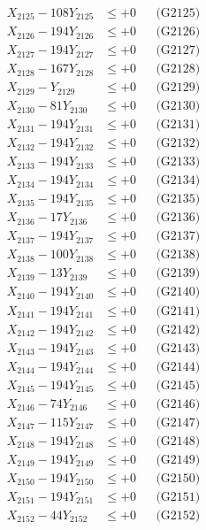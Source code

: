 \documentclass[a4paper,10pt]{article}
\begin{document}
{\begin{align}
X_{2125} - 108Y_{2125} &\leq +0 && \text{(G2125)} \\
X_{2126} - 194Y_{2126} &\leq +0 && \text{(G2126)} \\
X_{2127} - 194Y_{2127} &\leq +0 && \text{(G2127)} \\
X_{2128} - 167Y_{2128} &\leq +0 && \text{(G2128)} \\
X_{2129} - Y_{2129} &\leq +0 && \text{(G2129)} \\
X_{2130} - 81Y_{2130} &\leq +0 && \text{(G2130)} \\
\allowbreak
X_{2131} - 194Y_{2131} &\leq +0 && \text{(G2131)} \\
X_{2132} - 194Y_{2132} &\leq +0 && \text{(G2132)} \\
X_{2133} - 194Y_{2133} &\leq +0 && \text{(G2133)} \\
X_{2134} - 194Y_{2134} &\leq +0 && \text{(G2134)} \\
X_{2135} - 194Y_{2135} &\leq +0 && \text{(G2135)} \\
X_{2136} - 17Y_{2136} &\leq +0 && \text{(G2136)} \\
X_{2137} - 194Y_{2137} &\leq +0 && \text{(G2137)} \\
X_{2138} - 100Y_{2138} &\leq +0 && \text{(G2138)} \\
X_{2139} - 13Y_{2139} &\leq +0 && \text{(G2139)} \\
X_{2140} - 194Y_{2140} &\leq +0 && \text{(G2140)} \\
\allowbreak
X_{2141} - 194Y_{2141} &\leq +0 && \text{(G2141)} \\
X_{2142} - 194Y_{2142} &\leq +0 && \text{(G2142)} \\
X_{2143} - 194Y_{2143} &\leq +0 && \text{(G2143)} \\
X_{2144} - 194Y_{2144} &\leq +0 && \text{(G2144)} \\
X_{2145} - 194Y_{2145} &\leq +0 && \text{(G2145)} \\
X_{2146} - 74Y_{2146} &\leq +0 && \text{(G2146)} \\
X_{2147} - 115Y_{2147} &\leq +0 && \text{(G2147)} \\
X_{2148} - 194Y_{2148} &\leq +0 && \text{(G2148)} \\
X_{2149} - 194Y_{2149} &\leq +0 && \text{(G2149)} \\
X_{2150} - 194Y_{2150} &\leq +0 && \text{(G2150)} \\
\allowbreak
X_{2151} - 194Y_{2151} &\leq +0 && \text{(G2151)} \\
X_{2152} - 44Y_{2152} &\leq +0 && \text{(G2152)} \\

\end{align}}
\end{document}
